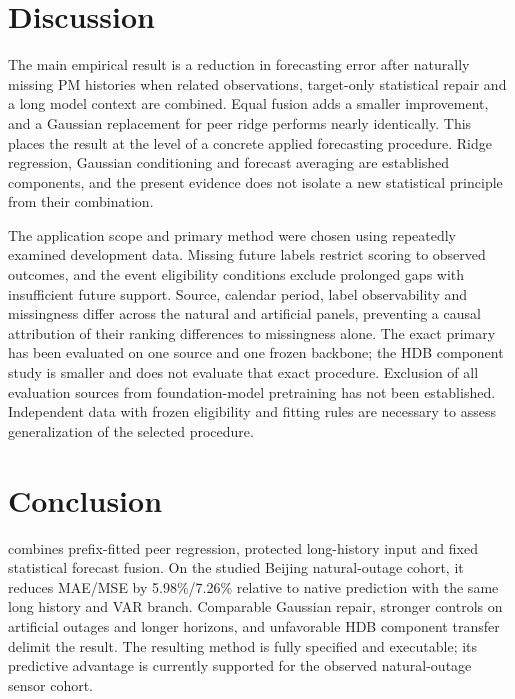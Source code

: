 \section{Discussion}
\label{sec:discussion}

The main empirical result is a reduction in forecasting error after naturally missing PM histories when related observations, target-only statistical repair and a long model context are combined. Equal fusion adds a smaller improvement, and a Gaussian replacement for peer ridge performs nearly identically. This places the result at the level of a concrete applied forecasting procedure. Ridge regression, Gaussian conditioning and forecast averaging are established components, and the present evidence does not isolate a new statistical principle from their combination.

The application scope and primary method were chosen using repeatedly examined development data. Missing future labels restrict scoring to observed outcomes, and the event eligibility conditions exclude prolonged gaps with insufficient future support. Source, calendar period, label observability and missingness differ across the natural and artificial panels, preventing a causal attribution of their ranking differences to missingness alone. The exact primary has been evaluated on one source and one frozen backbone; the HDB component study is smaller and does not evaluate that exact procedure. Exclusion of all evaluation sources from foundation-model pretraining has not been established. Independent data with frozen eligibility and fitting rules are necessary to assess generalization of the selected procedure.

\section{Conclusion}
\label{sec:conclusion}

\method{} combines prefix-fitted peer regression, protected long-history input and fixed statistical forecast fusion. On the studied Beijing natural-outage cohort, it reduces MAE/MSE by 5.98\%/7.26\% relative to native prediction with the same long history and VAR branch. Comparable Gaussian repair, stronger controls on artificial outages and longer horizons, and unfavorable HDB component transfer delimit the result. The resulting method is fully specified and executable; its predictive advantage is currently supported for the observed natural-outage sensor cohort.
